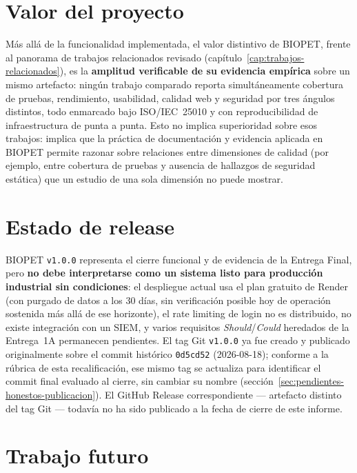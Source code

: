 \section{Valor del proyecto}

M\'as all\'a de la funcionalidad implementada, el valor distintivo de
BIOPET, frente al panorama de trabajos relacionados revisado
(cap\'itulo~\ref{cap:trabajos-relacionados}), es la \textbf{amplitud
verificable de su evidencia emp\'irica} sobre un mismo artefacto: ning\'un
trabajo comparado reporta simult\'aneamente cobertura de pruebas,
rendimiento, usabilidad, calidad web y seguridad por tres \'angulos
distintos, todo enmarcado bajo ISO/IEC~25010 y con reproducibilidad de
infraestructura de punta a punta. Esto no implica superioridad sobre esos
trabajos: implica que la pr\'actica de documentaci\'on y evidencia aplicada
en BIOPET permite razonar sobre relaciones entre dimensiones de calidad
(por ejemplo, entre cobertura de pruebas y ausencia de hallazgos de
seguridad est\'atica) que un estudio de una sola dimensi\'on no puede
mostrar.

\section{Estado de release}

BIOPET \texttt{v1.0.0} representa el cierre funcional y de evidencia de la
Entrega Final, pero \textbf{no debe interpretarse como un sistema listo
para producci\'on industrial sin condiciones}: el despliegue actual usa el
plan gratuito de Render (con purgado de datos a los 30 d\'ias, sin
verificaci\'on posible hoy de operaci\'on sostenida m\'as all\'a de ese
horizonte), el rate limiting de login no es distribuido, no existe
integraci\'on con un SIEM, y varios requisitos \emph{Should}/\emph{Could}
heredados de la Entrega~1A permanecen pendientes. El tag Git
\texttt{v1.0.0} ya fue creado y publicado originalmente sobre el commit
hist\'orico \texttt{0d5cd52} (2026-08-18); conforme a la r\'ubrica de esta
recalificaci\'on, ese mismo tag se actualiza para identificar el commit
final evaluado al cierre, sin cambiar su nombre
(secci\'on~\ref{sec:pendientes-honestos-publicacion}). El GitHub Release
correspondiente --- artefacto
distinto del tag Git --- todav\'ia no ha sido publicado a la fecha de
cierre de este informe.

\section{Trabajo futuro}

